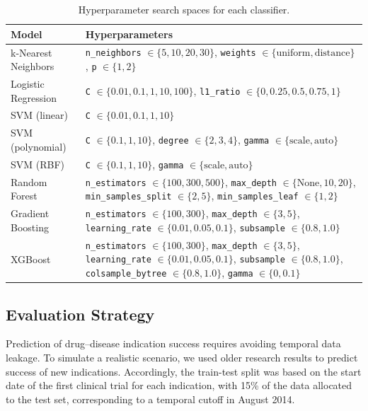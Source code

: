 \begin{table}[H]
    \centering
    \footnotesize
    \caption{Hyperparameter search spaces for each classifier.}
    \label{tab:hyperparameters}
    \begin{tabular}{p{4cm} p{10cm}}
        \toprule
        \textbf{Model} & \textbf{Hyperparameters} \\
        \midrule
        k-Nearest Neighbors & \texttt{n\_neighbors} $\in \{5, 10, 20, 30\}$, \texttt{weights} $\in \{\text{uniform}, \text{distance}\}$, \texttt{p} $\in \{1, 2\}$ \\
        Logistic Regression & \texttt{C} $\in \{0.01, 0.1, 1, 10, 100\}$, \texttt{l1\_ratio} $\in \{0, 0.25, 0.5, 0.75, 1\}$ \\
        SVM (linear) & \texttt{C} $\in \{0.01, 0.1, 1, 10\}$ \\
        SVM (polynomial) & \texttt{C} $\in \{0.1, 1, 10\}$, \texttt{degree} $\in \{2, 3, 4\}$, \texttt{gamma} $\in \{\text{scale}, \text{auto}\}$ \\
        SVM (RBF) & \texttt{C} $\in \{0.1, 1, 10\}$, \texttt{gamma} $\in \{\text{scale}, \text{auto}\}$ \\
        Random Forest & \texttt{n\_estimators} $\in \{100, 300, 500\}$, \texttt{max\_depth} $\in \{\text{None}, 10, 20\}$, \texttt{min\_samples\_split} $\in \{2, 5\}$, \texttt{min\_samples\_leaf} $\in \{1, 2\}$ \\
        Gradient Boosting & \texttt{n\_estimators} $\in \{100, 300\}$, \texttt{max\_depth} $\in \{3, 5\}$, \texttt{learning\_rate} $\in \{0.01, 0.05, 0.1\}$, \texttt{subsample} $\in \{0.8, 1.0\}$ \\
        XGBoost & \texttt{n\_estimators} $\in \{100, 300\}$, \texttt{max\_depth} $\in \{3, 5\}$, \texttt{learning\_rate} $\in \{0.01, 0.05, 0.1\}$, \texttt{subsample} $\in \{0.8, 1.0\}$, \texttt{colsample\_bytree} $\in \{0.8, 1.0\}$, \texttt{gamma} $\in \{0, 0.1\}$ \\
        \bottomrule
    \end{tabular}
\end{table}


\subsection{Evaluation Strategy}
Prediction of drug--disease indication success requires avoiding temporal data leakage.
To simulate a realistic scenario, we used older research results
to predict success of new indications. Accordingly, the train-test split was based on the start date of the first clinical trial for each indication, with 15\% of the data allocated
to the test set, corresponding to a temporal cutoff in August 2014.

